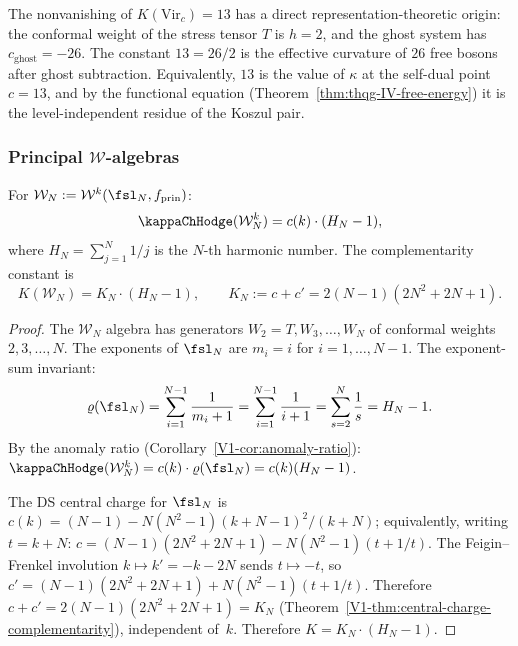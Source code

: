 \begin{remark}
The nonvanishing of $K(\mathrm{Vir}_c) = 13$ has a direct
representation-theoretic origin: the conformal weight of the stress tensor
$T$ is $h = 2$, and the ghost system has $c_{\mathrm{ghost}} = -26$.
The constant $13 = 26/2$ is the effective curvature of $26$ free bosons
after ghost subtraction. Equivalently, $13$ is the value of $\kappa$
at the self-dual point $c = 13$, and by the functional equation
(Theorem~\ref{thm:thqg-IV-free-energy}) it is the level-independent
residue of the Koszul pair.
\end{remark}

\subsubsection{Principal \texorpdfstring{$\mathcal{W}$}{W}-algebras}

\begin{theorem}
For $\mathcal{W}_N := \mathcal{W}^k(\fsl_N, f_{\mathrm{prin}})$:
\begin{equation}%
\kappaChHodge(\mathcal{W}_N^k) = c(k) \cdot (H_N - 1),
\end{equation}
where $H_N = \sum_{j=1}^N 1/j$ is the $N$-th harmonic number. The complementarity constant is
\begin{equation}%
K(\mathcal{W}_N) = K_N \cdot (H_N - 1),
\qquad K_N := c + c' = 2(N{-}1)(2N^2{+}2N{+}1).
\end{equation}
\end{theorem}

\begin{proof}
The $\mathcal{W}_N$ algebra has generators $W_2 = T, W_3, \ldots, W_N$
of conformal weights $2, 3, \ldots, N$. The exponents of $\fsl_N$ are
$m_i = i$ for $i = 1, \ldots, N-1$. The exponent-sum invariant:
\[
\varrho(\fsl_N)
= \sum_{i=1}^{N-1} \frac{1}{m_i + 1}
= \sum_{i=1}^{N-1} \frac{1}{i+1}
= \sum_{s=2}^N \frac{1}{s}
= H_N - 1.
\]
By the anomaly ratio (Corollary~\ref{V1-cor:anomaly-ratio}):
$\kappaChHodge(\mathcal{W}_N^k) = c(k) \cdot \varrho(\fsl_N) = c(k)(H_N - 1)$.

The DS central charge for $\fsl_N$ is
$c(k) = (N-1) - N(N^2-1)(k+N-1)^2/(k+N)$;
equivalently, writing $t = k+N$: $c = (N-1)(2N^2+2N+1) - N(N^2-1)(t + 1/t)$.
The Feigin--Frenkel involution $k \mapsto k' = -k - 2N$ sends $t \mapsto -t$,
so $c' = (N-1)(2N^2+2N+1) + N(N^2-1)(t + 1/t)$. Therefore
$c + c' = 2(N-1)(2N^2+2N+1) = K_N$
(Theorem~\ref{V1-thm:central-charge-complementarity}),
independent of~$k$.
Therefore $K = K_N \cdot (H_N - 1)$.
\end{proof}

